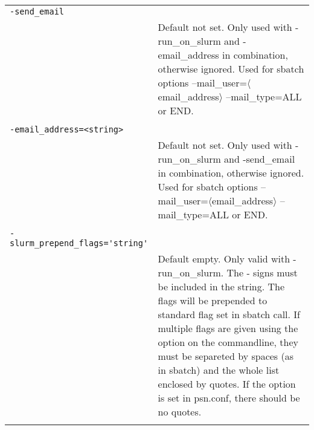 \documentclass[a4paper,12pt]{article}
\begin{document}
\begin{longtable}{p{1in}p{4in}}
\\
\verb|-send_email| & \\
\nopagebreak
 & Default not set. Only used with -run\_on\_slurm and -email\_address in combination, otherwise ignored. Used for sbatch options --mail\_user=$\langle$email\_address$\rangle$ --mail\_type=ALL or END.  \\
\\
\verb|-email_address=<string>| & \\
\nopagebreak
 & Default not set. Only used with -run\_on\_slurm and -send\_email in combination, otherwise ignored. Used for sbatch options --mail\_user=$\langle$email\_address$\rangle$ --mail\_type=ALL or END.  \\
\\
\verb|-slurm_prepend_flags='string'| & \\
\nopagebreak
 & Default empty. Only valid with -run\_on\_slurm. The - signs must be included in the string. The flags will be prepended to standard flag set in sbatch call. If multiple flags are given using the option on the commandline, they must be separeted by spaces (as in sbatch) and the whole list enclosed by quotes. If the option is set in psn.conf, there should be no quotes. \\
\\
\end{longtable}
\end{document}
